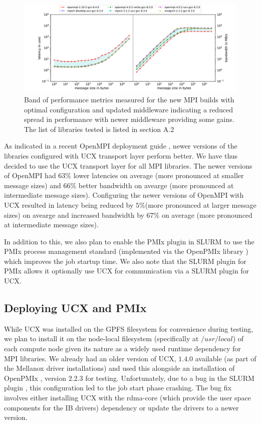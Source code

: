 \documentclass[manuscript,screen]{acmart}
\begin{document}
\begin{figure}
	\hspace*{-1.5cm}\includegraphics[scale=0.6]{new_pearc}
	\caption{Band of performance metrics measured for the new MPI
		builds with optimal configuration and updated middleware
		indicating a reduced spread in performance with newer middleware providing some gains. The list of libraries tested is listed in section A.2}
	\label{fig:newmpi}
\end{figure}

As indicated in a recent OpenMPI deployment guide \cite{openmpi_deployment_tuning}, newer versions of the libraries  configured with UCX transport layer perform better. We have thus decided to use the UCX transport layer for all MPI libraries. The newer versions of OpenMPI had $63\%$ lower latencies on average (more pronounced at smaller message sizes) and $66\%$ better bandwidth on avearge (more pronounced at intermediate message sizes). Configuring the newer versions of OpenMPI with UCX resulted in latency being reduced by $5\%$(more pronounced at larger message sizes) on avearge and increased bandwidth by $67\%$ on average (more pronounced at intermediate message sizes).

In addition to this, we also plan to enable the PMIx plugin \cite{slurm_pmix_sc17,slurm_pmix_2019} in SLURM to use the PMIx process management standard \cite{pmix,pmix_website} (implemented via the OpenPMIx library \cite{openpmix_website}) which improves the job startup time. We also note that the SLURM plugin for PMIx allows it optionally use UCX for communication via a SLURM plugin for UCX.

\subsection{Deploying UCX and PMIx}
While UCX was installed on the GPFS filesystem for convenience during testing, we plan to install it on the node-local filesystem (specifically at $/usr/local$) of each compute node given its nature as a widely used runtime dependency for MPI libraries. We already had an older version of UCX, $1.4.0$ available (as part of the Mellanox driver installations) and used this alongside an installation of OpenPMIx \cite{openpmix_website}, version $2.2.3$ for testing. Unfortunately, due to a bug in the SLURM plugin \cite{slurm_ucx_bug}, this configuration led to the job start phase crashing. The bug fix involves either installing UCX with the rdma-core \cite{rdmacore_repository}(which provide the user space components for the IB drivers) dependency or update the drivers to a newer version.
\end{document}
